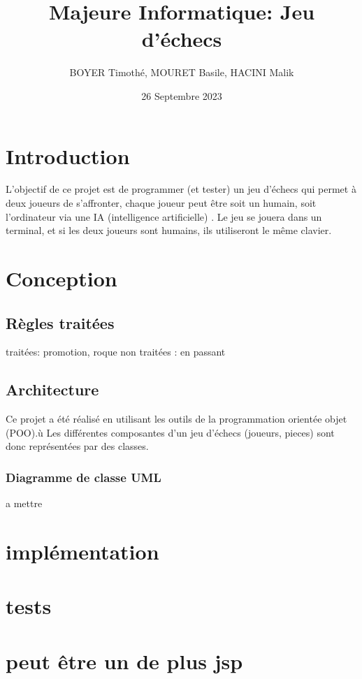\documentclass{article}
\title{\centering Majeure Informatique: 
Jeu d'échecs}
\author{BOYER Timothé, MOURET Basile, HACINI Malik}
\date{26 Septembre 2023}
\begin{document}
    
    

\maketitle
\tableofcontents{}

\section{Introduction}
L’objectif de ce projet est de programmer (et tester) un jeu
d’échecs qui permet à deux joueurs de s’affronter, 
chaque joueur peut être soit un humain, soit l’ordinateur via une IA
 (intelligence artificielle) . Le jeu se jouera dans un terminal, 
 et si les deux joueurs sont humains, ils utiliseront le même clavier.
\section{Conception}
\subsection{Règles traitées}
traitées: promotion, roque
non traitées : en passant
\subsection{Architecture}
Ce projet a été réalisé en utilisant les outils de la programmation orientée objet (POO).ù
Les différentes composantes d'un jeu d'échecs (joueurs, pieces) sont donc 
représentées par des classes.
\subsubsection{Diagramme de classe UML}
a mettre



\section{implémentation}
\section{tests}
\section{peut être un de plus jsp}
\end{document}
